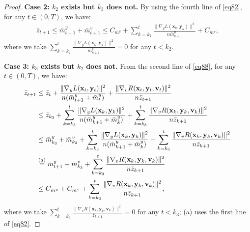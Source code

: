 \documentclass{article}
\theoremstyle{plain}
\theoremstyle{definition}
\theoremstyle{remark}
\begin{document}
\begin{proof}
\textbf{Case 2: $k_2$ exists but $k_3$ does not.}  
By using the fourth line of \cref{eq82}, for any $t \in (0, T)$, we have:
\begin{align}
\bar{z}_{t+1}  \leq \bar{m}^y_{t+1}+\bar{m}^v_{t+1} \leq C_{m^y} + \sum_{k=k_2}^t  \frac{\|\nabla_y L(\mathbf{x}_k, \mathbf{y}_k)\|^2}{n\bar{m}^y_{k+1}}  + C_{m^v},\label{eq89}
\end{align}
where we take $\sum_{k=k_2}^t \frac{\|\nabla_y L(\mathbf{x}_k, \mathbf{y}_k)\|^2}{\bar{m}^y_{k+1}} = 0$ for any $t < k_2$.

\textbf{Case 3: $k_3$ exists but $k_2$ does not.}  
From the second line of \cref{eq88}, for any $t \in (0, T)$, we have:
\begin{align}
\bar{z}_{t+1} 
&\leq \bar{z}_{t} + \frac{\|\nabla_y L(\mathbf{x}_t, \mathbf{y}_t)\|^2}{n(\bar{m}^y_{t+1}+\bar{m}^y_{t})} + \frac{\|\nabla_v R(\mathbf{x}_t, \mathbf{y}_t, \mathbf{v}_t)\|^2}{n\bar{z}_{t+1}} \notag \\
&\leq \bar{z}_{k_3} + \sum_{k=k_3}^t  \frac{\|\nabla_y L(\mathbf{x}_k, \mathbf{y}_k)\|^2}{n(\bar{m}^y_{k+1}+\bar{m}^y_{k})} + \sum_{k=k_3}^t \frac{\|\nabla_v R(\mathbf{x}_k, \mathbf{y}_k, \mathbf{v}_k)\|^2}{n\bar{z}_{k+1}}  \notag \\
&\leq \bar{m}^y_{k_3} + \bar{m}^v_{k_3} + \sum_{k=k_3}^t  \frac{\|\nabla_y L(\mathbf{x}_k, \mathbf{y}_k)\|^2}{n(\bar{m}^y_{k+1}+\bar{m}^y_{k})} + \sum_{k=k_3}^t \frac{\|\nabla_v R(\mathbf{x}_k, \mathbf{y}_k, \mathbf{v}_k)\|^2}{n\bar{z}_{k+1}} \notag \\
&\overset{(a)}{=} \bar{m}^y_{t+1} + \bar{m}^v_{k_3} + \sum_{k=k_3}^t \frac{\|\nabla_v R(\mathbf{x}_k, \mathbf{y}_k, \mathbf{v}_k)\|^2}{n\bar{z}_{k+1}} \notag \\
&\leq C_{m^y} + C_{m^v} + \sum_{k=k_3}^t \frac{\|\nabla_v R(\mathbf{x}_k, \mathbf{y}_k, \mathbf{v}_k)\|^2}{n\bar{z}_{k+1}},\label{eq90}
 \end{align}
where we take $\sum_{k=k_3}^t \frac{\|\nabla_v  R(\mathbf{x}_k, \mathbf{y}_k, \mathbf{v}_k)\|^2}{\bar{z}_{k+1}} = 0$ for any $t < k_3$; (a) uses the first line of \cref{eq82}.


\end{proof}
\end{document}
